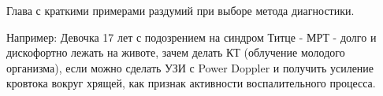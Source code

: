 Глава с краткими примерами раздумий при выборе метода диагностики.

Например:
Девочка 17 лет с подозрением на синдром Титце - МРТ - долго и дискофортно лежать на животе, зачем делать КТ (облучение молодого организма), если можно сделать УЗИ с Power Doppler и получить усиление кровтока вокруг хрящей, как признак активности воспалительного процесса.